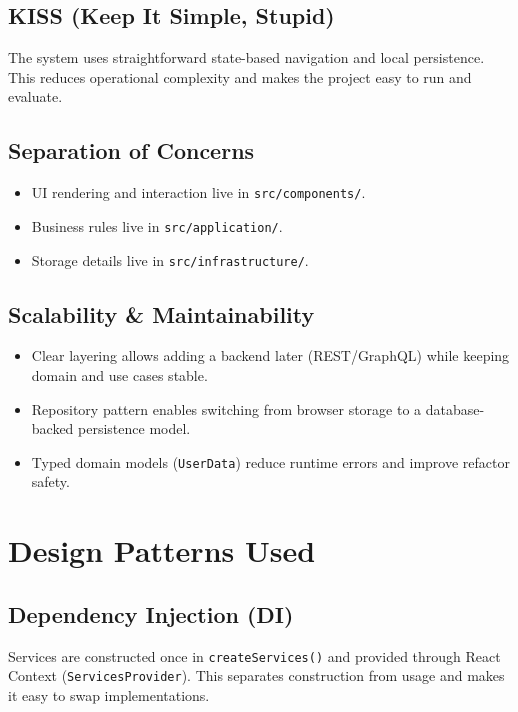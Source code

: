 \documentclass[11pt]{article}
\begin{document}
\subsection{KISS (Keep It Simple, Stupid)}
The system uses straightforward state-based navigation and local persistence. This reduces operational complexity and makes the project easy to run and evaluate.

\subsection{Separation of Concerns}
\begin{itemize}[leftmargin=1.2em]
  \item UI rendering and interaction live in \texttt{src/components/}.
  \item Business rules live in \texttt{src/application/}.
  \item Storage details live in \texttt{src/infrastructure/}.
\end{itemize}

\subsection{Scalability \& Maintainability}
\begin{itemize}[leftmargin=1.2em]
  \item Clear layering allows adding a backend later (REST/GraphQL) while keeping domain and use cases stable.
  \item Repository pattern enables switching from browser storage to a database-backed persistence model.
  \item Typed domain models (\texttt{UserData}) reduce runtime errors and improve refactor safety.
\end{itemize}

\section{Design Patterns Used}

\subsection{Dependency Injection (DI)}
Services are constructed once in \texttt{createServices()} and provided through React Context (\texttt{ServicesProvider}).
This separates construction from usage and makes it easy to swap implementations.
\end{document}
